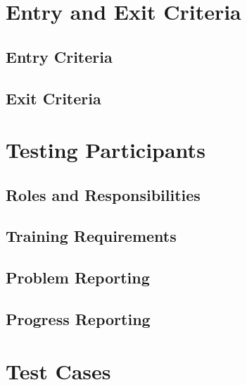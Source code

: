 \documentclass[12pt]{article}
\begin{document}
\section{Entry and Exit Criteria}
\subsection{Entry Criteria}
\subsection{Exit Criteria}

\section{Testing Participants}
\subsection{Roles and Responsibilities}
\subsection{Training Requirements}
\subsection{Problem Reporting}
\subsection{Progress Reporting}

\section{Test Cases}
\end{document}

